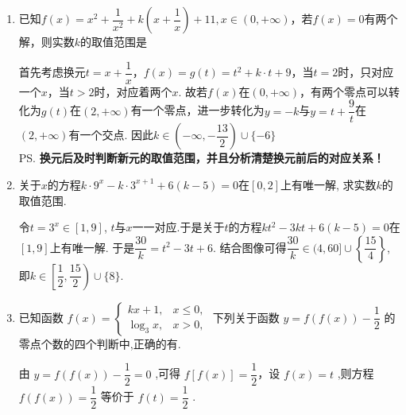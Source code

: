 \begin{enumerate}
\begin{jieda}
\begin{dingautolist}{172}
            得 $x = \dfrac{1}{k}{{e}}^{\frac{1}{{e}} - 1}$
        \end{dingautolist}
        综上,不管 $k > 0$ 还是 $k < 0$ ,函数都是 3 个零点.
    \end{jieda}
    \item 已知$f(x) = x^2 + \dfrac{1}{x^2} + k \left(x + \dfrac{1}{x}\right)+11, x \in (0, +\infty)$，若$f(x) = 0$有两个解，则实数$k$的取值范围是
    \begin{jieda}
        首先考虑换元$t = x + \dfrac{1}{x}$，$f(x) = g(t) = t^2+k\cdot t + 9$，当$t = 2$时，只对应一个$x$，当$t > 2$时，对应着两个$x$. 故若$f(x)$在$(0, +\infty)$，有两个零点可以转化为$g(t)$在$(2, +\infty)$有一个零点，进一步转化为$y = -k$与$y = t + \dfrac{9}{t}$在$(2, +\infty)$有一个交点. 因此$k \in \left(-\infty, -\dfrac{13}{2}\right) \cup \{-6\}$ \\
        \ps \textbf{换元后及时判断新元的取值范围，并且分析清楚换元前后的对应关系！}
    \end{jieda}
    
    \item 关于$x$的方程$k\cdot9^x-k\cdot3^{x+1}+6(k-5)=0$在$[0,2]$上有唯一解, 求实数$k$的取值范围. 
    \begin{jieda}
    令$t=3^x\in[1,9]$, $t$与$x$一一对应.于是关于$t$的方程$kt^2-3kt+6(k-5)=0$在$[1,9]$上有唯一解. 于是$\dfrac{30}{k}=t^2-3t+6$. 结合图像可得$\dfrac{30}{k}\in(4,60]\cup\left\{\dfrac{15}{4}\right\}$, 即$k\in \left[\dfrac{1}{2},\dfrac{15}{2}\right)\cup\{8\}$. 
    \end{jieda}

    
    \item 已知函数 $f\left( x\right)  = \left\{  \begin{array}{ll} {kx} + 1, & x \leq  0, \\  {\log }_{3}x, & x > 0, \end{array}\right.$ 下列关于函数 $y = f\left( {f\left( x\right) }\right)  - \dfrac{1}{2}$ 的零点个数的四个判断中,正确的有.
    \begin{jieda}
        由 $y = f\left( {f\left( x\right) }\right)  - \dfrac{1}{2} = 0$ ,可得 $f\left\lbrack  {f\left( x\right) }\right\rbrack   = \dfrac{1}{2}$，设 $f\left( x\right)  = t$ ,则方程 $f\left( {f\left( x\right) }\right)  = \dfrac{1}{2}$ 等价于 $f\left( t\right)  = \dfrac{1}{2}$ .
        

\end{jieda}
\end{enumerate}
